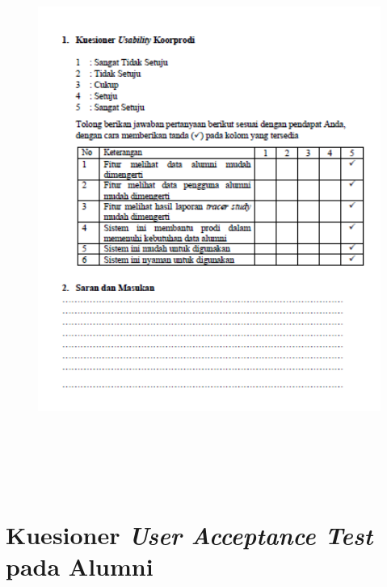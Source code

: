 \begin{figure}[H]
	\centering
	\includegraphics[width=15cm,height=18cm]{gambar/UAT/ku_koorprodi}
	\label{ku_koorprodi}
\end{figure}


\chapter{Kuesioner \textit{User Acceptance Test} pada Alumni}

